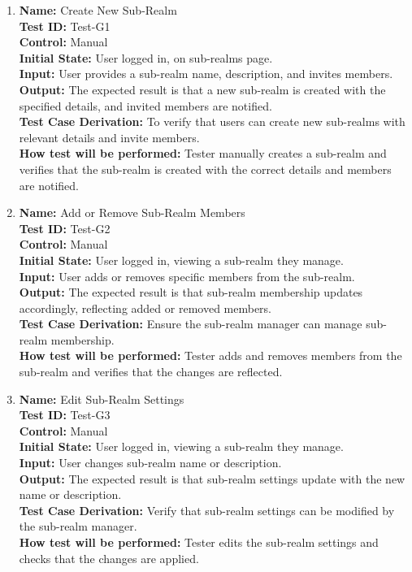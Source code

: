 \documentclass[12pt, titlepage]{article}
\begin{document}
\begin{enumerate}

    \item \textbf{Name:} {Create New Sub-Realm} \label{itm:Test-G1}\\
    \textbf{Test ID:} Test-G1\\
    \textbf{Control:} Manual \\
    \textbf{Initial State:} User logged in, on sub-realms page. \\
    \textbf{Input:} User provides a sub-realm name, description, and invites members. \\
    \textbf{Output:} The expected result is that a new sub-realm is created with the specified details, and invited members are notified. \\
    \textbf{Test Case Derivation:} To verify that users can create new sub-realms with relevant details and invite members. \\
    \textbf{How test will be performed:} Tester manually creates a sub-realm and verifies that the sub-realm is created with the correct details and members are notified.

    \item \textbf{Name:} {Add or Remove Sub-Realm Members} \label{itm:Test-G2}\\
    \textbf{Test ID:} Test-G2\\
    \textbf{Control:} Manual \\
    \textbf{Initial State:} User logged in, viewing a sub-realm they manage. \\
    \textbf{Input:} User adds or removes specific members from the sub-realm. \\
    \textbf{Output:} The expected result is that sub-realm membership updates accordingly, reflecting added or removed members. \\
    \textbf{Test Case Derivation:} Ensure the sub-realm manager can manage sub-realm membership. \\
    \textbf{How test will be performed:} Tester adds and removes members from the sub-realm and verifies that the changes are reflected.

    \item \textbf{Name:} {Edit Sub-Realm Settings} \label{itm:Test-G3}\\
    \textbf{Test ID:} Test-G3\\
    \textbf{Control:} Manual \\
    \textbf{Initial State:} User logged in, viewing a sub-realm they manage. \\
    \textbf{Input:} User changes sub-realm name or description. \\
    \textbf{Output:} The expected result is that sub-realm settings update with the new name or description. \\
    \textbf{Test Case Derivation:} Verify that sub-realm settings can be modified by the sub-realm manager. \\
    \textbf{How test will be performed:} Tester edits the sub-realm settings and checks that the changes are applied.


\end{enumerate}
\end{document}
